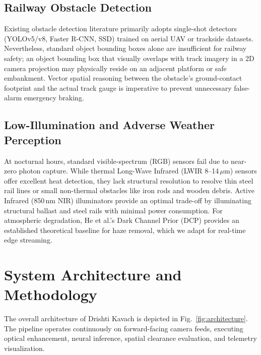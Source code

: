 \documentclass[conference]{IEEEtran}
\begin{document}
\subsection{Railway Obstacle Detection}
Existing obstacle detection literature primarily adopts single-shot detectors (YOLOv5/v8, Faster R-CNN, SSD) trained on aerial UAV or trackside datasets. Nevertheless, standard object bounding boxes alone are insufficient for railway safety; an object bounding box that visually overlaps with track imagery in a 2D camera projection may physically reside on an adjacent platform or safe embankment. Vector spatial reasoning between the obstacle's ground-contact footprint and the actual track gauge is imperative to prevent unnecessary false-alarm emergency braking.

\subsection{Low-Illumination and Adverse Weather Perception}
At nocturnal hours, standard visible-spectrum (RGB) sensors fail due to near-zero photon capture. While thermal Long-Wave Infrared (LWIR 8--14\,$\mu$m) sensors offer excellent heat detection, they lack structural resolution to resolve thin steel rail lines or small non-thermal obstacles like iron rods and wooden debris. Active Infrared (850\,nm NIR) illuminators provide an optimal trade-off by illuminating structural ballast and steel rails with minimal power consumption. For atmospheric degradation, He et al.'s Dark Channel Prior (DCP) provides an established theoretical baseline for haze removal, which we adapt for real-time edge streaming.

\section{System Architecture and Methodology}

The overall architecture of Drishti Kavach is depicted in Fig.~\ref{fig:architecture}. The pipeline operates continuously on forward-facing camera feeds, executing optical enhancement, neural inference, spatial clearance evaluation, and telemetry visualization.
\end{document}
